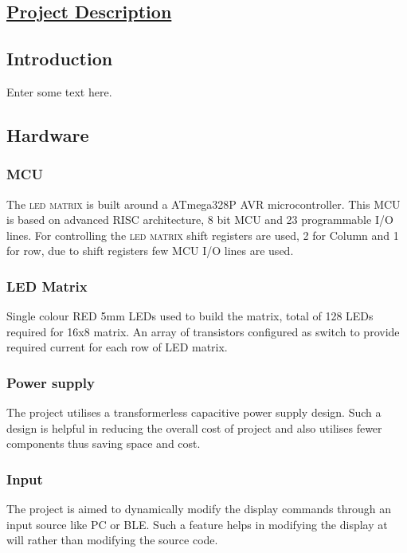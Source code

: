 \vspace*{8.5cm}

\begin{minipage}{1.0\textwidth}

\begin{flushright}
	\section{\huge{\underline{Project Description}}}
\end{flushright}
\end{minipage}

\begin{multicols}{2}

		\subsection{Introduction}
			Enter some text here.
			
		\subsection{Hardware}
			\subsubsection{MCU}
				The \textsc{led matrix} is built around a ATmega328P AVR microcontroller. This MCU is based on advanced RISC \cite{AtMega328P} architecture, 8 bit MCU and 23 programmable I/O lines. For controlling the \textsc{led matrix} shift registers are used, 2 for Column and 1 for row, due to shift registers few MCU I/O lines are used.
			\subsubsection{LED Matrix}
				 Single colour  RED 5mm LEDs used to build the matrix, total of 128 LEDs required for 16x8 matrix. An array of transistors configured as switch to provide required current for each row of LED matrix.  

			\subsubsection{Power supply}
				The project utilises a transformerless capacitive power supply design. Such a design is helpful in reducing the overall cost of project and also utilises fewer components thus saving space and cost.
				
				
			
			\subsubsection{Input}
				 The project is aimed to dynamically modify the display commands through an input source like PC or BLE. Such a feature helps in modifying the display at will rather than modifying the source code.

\end{multicols}

